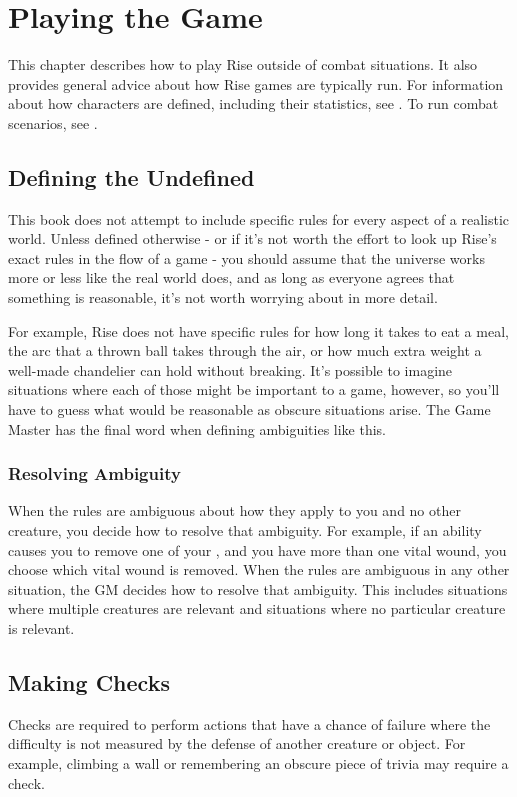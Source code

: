 \chapter{Playing the Game}\label{Playing the Game}

This chapter describes how to play Rise outside of combat situations.
It also provides general advice about how Rise games are typically run.
For information about how characters are defined, including their statistics, see .
To run combat scenarios, see .

\section{Defining the Undefined}
    This book does not attempt to include specific rules for every aspect of a realistic world.
    Unless defined otherwise - or if it's not worth the effort to look up Rise's exact rules in the flow of a game - you should assume that the universe works more or less like the real world does, and as long as everyone agrees that something is reasonable, it's not worth worrying about in more detail.

    For example, Rise does not have specific rules for how long it takes to eat a meal, the arc that a thrown ball takes through the air, or how much extra weight a well-made chandelier can hold without breaking.
    It's possible to imagine situations where each of those might be important to a game, however, so you'll have to guess what would be reasonable as obscure situations arise.
    The Game Master has the final word when defining ambiguities like this.

    \subsection{Resolving Ambiguity}\label{Resolving Ambiguity}
        When the rules are ambiguous about how they apply to you and no other creature, you decide how to resolve that ambiguity.
        For example, if an ability causes you to remove one of your , and you have more than one vital wound, you choose which vital wound is removed.
        When the rules are ambiguous in any other situation, the GM decides how to resolve that ambiguity.
        This includes situations where multiple creatures are relevant and situations where no particular creature is relevant.

\section{Making Checks}\label{Checks}\label{Making Checks}
    Checks are required to perform actions that have a chance of failure where the difficulty is not measured by the defense of another creature or object.
    For example, climbing a wall or remembering an obscure piece of trivia may require a check.


